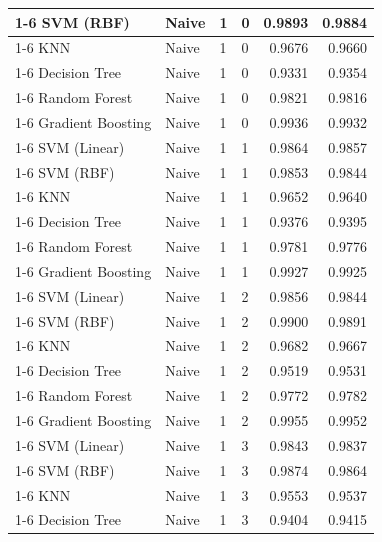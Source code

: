 \begin{table}
\begin{tabular}{llllrr}
\cline{1-6} \cline{2-6} \cline{3-6}
SVM (RBF) & Naive & 1 & 0 & 0.9893 & 0.9884 \\
\cline{1-6} \cline{2-6} \cline{3-6}
KNN & Naive & 1 & 0 & 0.9676 & 0.9660 \\
\cline{1-6} \cline{2-6} \cline{3-6}
Decision Tree & Naive & 1 & 0 & 0.9331 & 0.9354 \\
\cline{1-6} \cline{2-6} \cline{3-6}
Random Forest & Naive & 1 & 0 & 0.9821 & 0.9816 \\
\cline{1-6} \cline{2-6} \cline{3-6}
Gradient Boosting & Naive & 1 & 0 & 0.9936 & 0.9932 \\
\cline{1-6} \cline{2-6} \cline{3-6}
SVM (Linear) & Naive & 1 & 1 & 0.9864 & 0.9857 \\
\cline{1-6} \cline{2-6} \cline{3-6}
SVM (RBF) & Naive & 1 & 1 & 0.9853 & 0.9844 \\
\cline{1-6} \cline{2-6} \cline{3-6}
KNN & Naive & 1 & 1 & 0.9652 & 0.9640 \\
\cline{1-6} \cline{2-6} \cline{3-6}
Decision Tree & Naive & 1 & 1 & 0.9376 & 0.9395 \\
\cline{1-6} \cline{2-6} \cline{3-6}
Random Forest & Naive & 1 & 1 & 0.9781 & 0.9776 \\
\cline{1-6} \cline{2-6} \cline{3-6}
Gradient Boosting & Naive & 1 & 1 & 0.9927 & 0.9925 \\
\cline{1-6} \cline{2-6} \cline{3-6}
SVM (Linear) & Naive & 1 & 2 & 0.9856 & 0.9844 \\
\cline{1-6} \cline{2-6} \cline{3-6}
SVM (RBF) & Naive & 1 & 2 & 0.9900 & 0.9891 \\
\cline{1-6} \cline{2-6} \cline{3-6}
KNN & Naive & 1 & 2 & 0.9682 & 0.9667 \\
\cline{1-6} \cline{2-6} \cline{3-6}
Decision Tree & Naive & 1 & 2 & 0.9519 & 0.9531 \\
\cline{1-6} \cline{2-6} \cline{3-6}
Random Forest & Naive & 1 & 2 & 0.9772 & 0.9782 \\
\cline{1-6} \cline{2-6} \cline{3-6}
Gradient Boosting & Naive & 1 & 2 & 0.9955 & 0.9952 \\
\cline{1-6} \cline{2-6} \cline{3-6}
SVM (Linear) & Naive & 1 & 3 & 0.9843 & 0.9837 \\
\cline{1-6} \cline{2-6} \cline{3-6}
SVM (RBF) & Naive & 1 & 3 & 0.9874 & 0.9864 \\
\cline{1-6} \cline{2-6} \cline{3-6}
KNN & Naive & 1 & 3 & 0.9553 & 0.9537 \\
\cline{1-6} \cline{2-6} \cline{3-6}
Decision Tree & Naive & 1 & 3 & 0.9404 & 0.9415 \\

\end{tabular}
\end{table}
